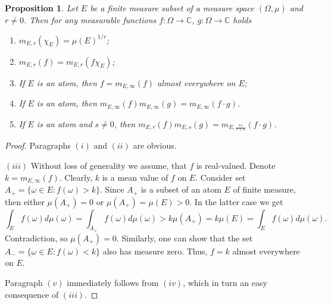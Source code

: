 \documentclass[12pt]{article}
\newtheorem{proposition}[theorem]{Proposition}
\begin{document}
\begin{proposition}\label{GnrlzdMeanProp}
    Let $E$ be a finite measure subset of a measure space $(\Omega,\mu)$ 
    and $r\neq 0$. Then for any measurable 
    functions $f:\Omega\to\mathbb{C}$, $g:\Omega\to\mathbb{C}$ holds
    \begin{enumerate}[label = (\roman*)]
        \item $m_{E,r}(\chi_E)=\mu(E)^{1/r}$;
        \item $m_{E,r}(f)=m_{E,r}(f\chi_E)$;
        \item If $E$ is an atom, then $f=m_{E,\infty}(f)$ almost 
        everywhere on $E$;
        \item If $E$ is an atom, 
        then $m_{E,\infty}(f)m_{E,\infty}(g)=m_{E,\infty}(f\cdot g)$.
        \item If $E$ is an atom and $s\neq 0$, 
        then $m_{E,r}(f)m_{E,s}(g)=m_{E,\frac{rs}{r+s}}(f\cdot g)$.
    \end{enumerate}
\end{proposition}
\begin{proof}
    Paragraphs $(i)$ and $(ii)$ are obvious.

    $(iii)$ Without loss of generality we assume, that $f$ is real-valued. 
    Denote $k=m_{E,\infty}(f)$. Clearly, $k$ is a mean value of $f$ on $E$. 
    Consider set $A_+=\{\omega\in E: f(\omega)>k\}$. Since $A_+$ is a 
    subset of an atom $E$ of finite measure, then either $\mu(A_+)=0$ 
    or $\mu(A_+)=\mu(E)>0$. In the latter case we get 
    \[
        \int_E f(\omega)d\mu(\omega)
        =\int_{A_+}f(\omega)d\mu(\omega)
        >k\mu(A_+)
        =k\mu(E)
        =\int_E f(\omega)d\mu(\omega).
    \]
    Contradiction, so $\mu(A_+)=0$. Similarly, one can show that the 
    set $A_-=\{\omega\in E:f(\omega)<k\}$ also has measure zero. 
    Thus, $f=k$ almost everywhere on $E$.

    Paragraph $(v)$ immediately follows from $(iv)$, which in turn an easy 
    consequence of $(iii)$.
\end{proof}
\end{document}
